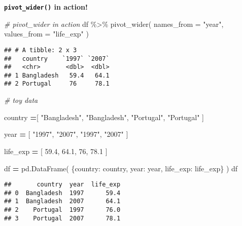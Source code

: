 \documentclass[
]{book}
\newenvironment{Shaded}{\begin{snugshade}}{\end{snugshade}}
\newcommand{\AttributeTok}[1]{\textcolor[rgb]{0.77,0.63,0.00}{#1}}
\newcommand{\CommentTok}[1]{\textcolor[rgb]{0.56,0.35,0.01}{\textit{#1}}}
\newcommand{\DecValTok}[1]{\textcolor[rgb]{0.00,0.00,0.81}{#1}}
\newcommand{\FloatTok}[1]{\textcolor[rgb]{0.00,0.00,0.81}{#1}}
\newcommand{\FunctionTok}[1]{\textcolor[rgb]{0.00,0.00,0.00}{#1}}
\newcommand{\NormalTok}[1]{#1}
\newcommand{\OperatorTok}[1]{\textcolor[rgb]{0.81,0.36,0.00}{\textbf{#1}}}
\newcommand{\SpecialCharTok}[1]{\textcolor[rgb]{0.00,0.00,0.00}{#1}}
\newcommand{\StringTok}[1]{\textcolor[rgb]{0.31,0.60,0.02}{#1}}
\begin{document}
{\textbf{\texttt{pivot\_wider()} in action!}}

\begin{Shaded}
\begin{Highlighting}[]
\CommentTok{\# pivot\_wider in action}
\NormalTok{df }\SpecialCharTok{\%\textgreater{}\%} 
  \FunctionTok{pivot\_wider}\NormalTok{(}
    \AttributeTok{names\_from =} \StringTok{"year"}\NormalTok{,}
    \AttributeTok{values\_from =} \StringTok{"life\_exp"}
\NormalTok{  )}
\end{Highlighting}
\end{Shaded}

\begin{verbatim}
## # A tibble: 2 x 3
##   country    `1997` `2007`
##   <chr>       <dbl>  <dbl>
## 1 Bangladesh   59.4   64.1
## 2 Portugal     76     78.1
\end{verbatim}

\begin{Shaded}
\begin{Highlighting}[]
\CommentTok{\# toy data}

\NormalTok{country }\OperatorTok{=}\NormalTok{[}
    \StringTok{"Bangladesh"}\NormalTok{, }\StringTok{"Bangladesh"}\NormalTok{,}
    \StringTok{"Portugal"}\NormalTok{, }\StringTok{"Portugal"}
\NormalTok{]}

\NormalTok{year }\OperatorTok{=}\NormalTok{ [}
    \StringTok{"1997"}\NormalTok{, }\StringTok{"2007"}\NormalTok{,}
    \StringTok{"1997"}\NormalTok{, }\StringTok{"2007"}
\NormalTok{]}

\NormalTok{life\_exp }\OperatorTok{=}\NormalTok{ [}
    \FloatTok{59.4}\NormalTok{, }\FloatTok{64.1}\NormalTok{,}
    \DecValTok{76}\NormalTok{, }\FloatTok{78.1}
\NormalTok{]}

\NormalTok{df }\OperatorTok{=}\NormalTok{ pd.DataFrame(}
\NormalTok{   \{}\StringTok{\textquotesingle{}country\textquotesingle{}}\NormalTok{: country,}
    \StringTok{\textquotesingle{}year\textquotesingle{}}\NormalTok{: year,}
    \StringTok{\textquotesingle{}life\_exp\textquotesingle{}}\NormalTok{: life\_exp\}}
\NormalTok{)}
\NormalTok{df}
\end{Highlighting}
\end{Shaded}

\begin{verbatim}
##       country  year  life_exp
## 0  Bangladesh  1997      59.4
## 1  Bangladesh  2007      64.1
## 2    Portugal  1997      76.0
## 3    Portugal  2007      78.1
\end{verbatim}
\end{document}

